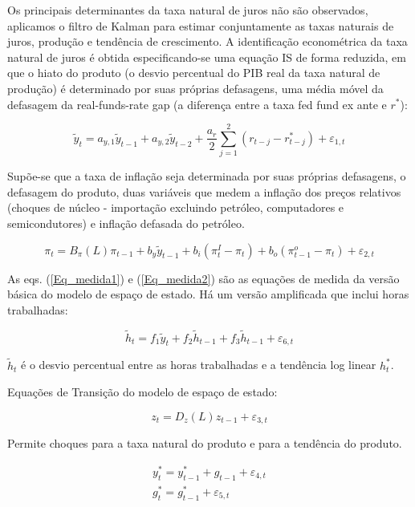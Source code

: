 Os principais determinantes da taxa natural de juros não são observados, aplicamos o filtro de Kalman para estimar conjuntamente as taxas naturais de juros, produção e tendência de crescimento. A identificação econométrica da taxa natural de juros é obtida especificando-se uma equação IS de forma reduzida, em que o hiato do produto (o desvio percentual do PIB real da taxa natural de produção) é determinado por suas próprias defasagens, uma média móvel da defasagem da real-funds-rate gap (a diferença entre a taxa fed fund ex ante e $r^{*}$):

\begin{equation} \label{Eq_medida1}
    \tilde{y}_t = a_{y,1}\tilde{y}_{t-1} + a_{y,2}\tilde{y}_{t-2} + \dfrac{a_r}{2}\sum_{j=1}^{2} (r_{t-j} - r_{t-j}^{*}) + \varepsilon_{1,t}
\end{equation}

Supõe-se que a taxa de inflação seja determinada por suas próprias defasagens, o defasagem do produto, duas variáveis que medem a inflação dos preços relativos (choques de núcleo - importação excluindo petróleo, computadores e semicondutores) e inflação defasada do petróleo.

\begin{equation} \label{Eq_medida2}
    \pi_t = B_{\pi}(L)\pi_{t-1} + b_y \tilde{y}_{t-1} + b_i(\pi_t^{I} - \pi_t ) + b_{o}(\pi_{t-1}^{o} - \pi_t) + \varepsilon_{2,t}
\end{equation}

As eqs. (\ref{Eq_medida1}) e (\ref{Eq_medida2}) são as equações de medida da versão básica do modelo de espaço de estado. Há um versão amplificada que inclui horas trabalhadas:

\begin{equation}
    \tilde{h}_t = f_1\tilde{y}_t + f_2\tilde{h}_{t-1} + f_3\tilde{h}_{t-1} + \varepsilon_{6,t}
\end{equation}

$\tilde{h}_t$ é o desvio percentual entre as horas trabalhadas e a tendência log linear $h_t^{*}$.

Equações de Transição do modelo de espaço de estado:

\begin{equation}
    z_t = D_z(L)z_{t-1} + \varepsilon_{3,t}
\end{equation}

Permite choques para a taxa natural do produto e para a tendência do produto.

\begin{eqnarray}
    y_t^{*} = y_{t-1}^{*} + g_{t-1} + \varepsilon_{4,t} \\
    g_t^{*} = g_{t-1}^{*} + \varepsilon_{5,t}
\end{eqnarray}

